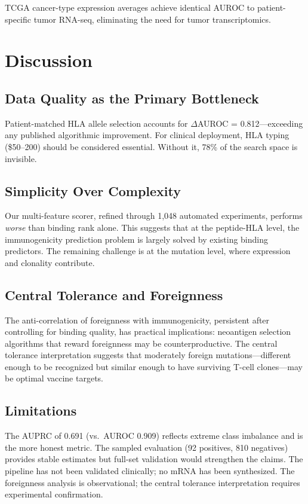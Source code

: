 \documentclass[11pt,twocolumn]{article}
\begin{document}
TCGA cancer-type expression averages achieve identical AUROC to patient-specific tumor RNA-seq, eliminating the need for tumor transcriptomics.

\section{Discussion}

\subsection{Data Quality as the Primary Bottleneck}

Patient-matched HLA allele selection accounts for $\Delta$AUROC = 0.812---exceeding any published algorithmic improvement. For clinical deployment, HLA typing (\$50--200) should be considered essential. Without it, 78\% of the search space is invisible.

\subsection{Simplicity Over Complexity}

Our multi-feature scorer, refined through 1,048 automated experiments, performs \textit{worse} than binding rank alone. This suggests that at the peptide-HLA level, the immunogenicity prediction problem is largely solved by existing binding predictors. The remaining challenge is at the mutation level, where expression and clonality contribute.

\subsection{Central Tolerance and Foreignness}

The anti-correlation of foreignness with immunogenicity, persistent after controlling for binding quality, has practical implications: neoantigen selection algorithms that reward foreignness may be counterproductive. The central tolerance interpretation suggests that moderately foreign mutations---different enough to be recognized but similar enough to have surviving T-cell clones---may be optimal vaccine targets.

\subsection{Limitations}

The AUPRC of 0.691 (vs.\ AUROC 0.909) reflects extreme class imbalance and is the more honest metric. The sampled evaluation (92 positives, 810 negatives) provides stable estimates but full-set validation would strengthen the claims. The pipeline has not been validated clinically; no mRNA has been synthesized. The foreignness analysis is observational; the central tolerance interpretation requires experimental confirmation.
\end{document}

